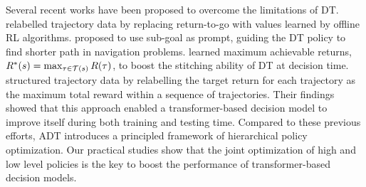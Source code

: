 Several recent works have been proposed to overcome the limitations of DT. 
\citet{yamagata2023q} relabelled trajectory data by replacing return-to-go with values learned by offline RL algorithms.  
\citet{badrinath2023waypoint} proposed to use sub-goal as prompt, guiding the DT policy to find shorter path in navigation problems. 
\citet{wu2023elastic} learned maximum achievable returns, $R^*(s)=\max_{\tau\in{\mathcal{T}}(s)} R(\tau)$, to boost the stitching ability of DT at decision time. 
\citet{liu2023emergent} structured trajectory data by relabelling the target return for each trajectory as the maximum total reward within a sequence of trajectories. 
Their findings showed that this approach enabled a transformer-based decision model to improve itself during both training and testing time.
Compared to these previous efforts, ADT introduces a principled framework of hierarchical policy optimization. Our practical studies show that the joint optimization of high and low level policies is the key to boost the performance of transformer-based decision models. 



\iffalse



\begin{algorithm*}[!htbp]
\centering
    \caption{Autotuned DT}
    \label{alg:ISPI}
    \begin{algorithmic}[1] %
        \REQUIRE  Training dataset $\mathcal{D}=\left\{\tau_1, \tau_2, \tau_3, \ldots, \tau_n\right\}$ of training trajectories. 
        \STATE //High-level policy
        \STATE Pre-train high-level policy following {\color{orange}{IQL for V-ADT}} or {\color{cyan}{HIQL for G-ADT}} 
        \STATE //Low-level policy
        \FOR{\text{each training epoch}}
        \STATE Compute $\pi_\theta\left(a_t \mid s_{t-k .. t}, p_{t-k .. t}\right)$
        \STATE  Calculate  {\color{orange}{$L_\theta(\tau)=xxxx$ for V-ADT}} or {\color{cyan}{$L_\theta(\tau)=xxxx$  for G-ADT}} \\
        \STATE Backpropagate gradients w.r.t $L_\theta(\tau)$ to update low-level policy parameters \\
        \ENDFOR
       
  
    \end{algorithmic}
\end{algorithm*}




\fi








